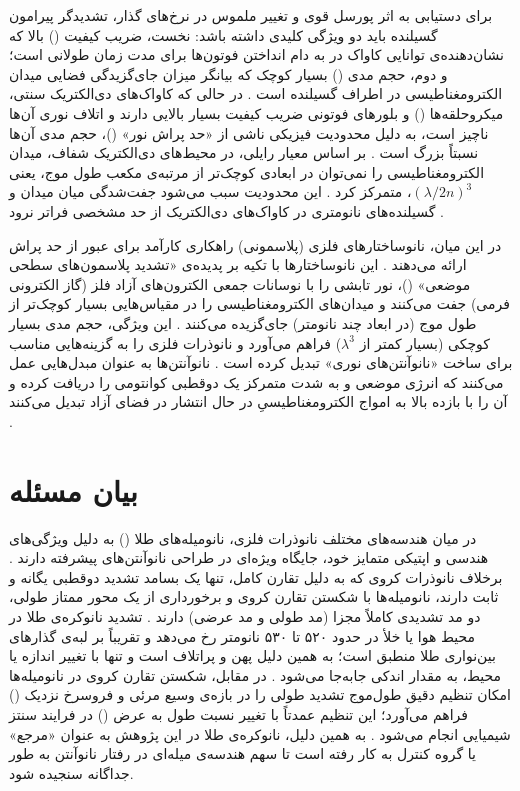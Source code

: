 \documentclass[12pt,a4paper]{report}
\begin{document}
برای دستیابی به اثر پورسل قوی و تغییر ملموس در نرخ‌های گذار، تشدیدگر پیرامون گسیلنده باید دو ویژگی کلیدی داشته باشد: نخست، ضریب کیفیت () بالا که نشان‌دهنده‌ی توانایی کاواک در به دام انداختن فوتون‌ها برای مدت زمان طولانی است؛ و دوم، حجم مدی () بسیار کوچک که بیانگر میزان جای‌گزیدگی فضایی میدان الکترومغناطیسی در اطراف گسیلنده است \cite{novotny,maier}. در حالی که کاواک‌های دی‌الکتریک سنتی، میکروحلقه‌ها () و بلورهای فوتونی ضریب کیفیت بسیار بالایی دارند و اتلاف نوری آن‌ها ناچیز است، به دلیل محدودیت فیزیکی ناشی از «حد پراش نور» ()، حجم مدی آن‌ها نسبتاً بزرگ است \cite{maier,novotny}. بر اساس معیار رایلی، در محیط‌های دی‌الکتریک شفاف، میدان الکترومغناطیسی را نمی‌توان در ابعادی کوچک‌تر از مرتبه‌ی مکعب طول موج، یعنی $(\lambda/2n)^3$، متمرکز کرد \cite{novotny}. این محدودیت سبب می‌شود جفت‌شدگی میان میدان و گسیلنده‌های نانومتری در کاواک‌های دی‌الکتریک از حد مشخصی فراتر نرود \cite{novotny,maier}.

در این میان، نانوساختارهای فلزی (پلاسمونی) راهکاری کارآمد برای عبور از حد پراش ارائه می‌دهند \cite{maier,novotny}. این نانوساختارها با تکیه بر پدیده‌ی «تشدید پلاسمون‌های سطحی موضعی» ()، نور تابشی را با نوسانات جمعی الکترون‌های آزاد فلز (گاز الکترونی فرمی) جفت می‌کنند و میدان‌های الکترومغناطیسی را در مقیاس‌هایی بسیار کوچک‌تر از طول موج (در ابعاد چند نانومتر) جای‌گزیده می‌کنند \cite{maier}. این ویژگی، حجم مدی بسیار کوچکی (بسیار کمتر از $\lambda^3$) فراهم می‌آورد و نانوذرات فلزی را به گزینه‌هایی مناسب برای ساخت «نانوآنتن‌های نوری» تبدیل کرده است \cite{novotny,bharadwaj}. نانوآنتن‌ها به عنوان مبدل‌هایی عمل می‌کنند که انرژی موضعی و به شدت متمرکز یک دوقطبی کوانتومی را دریافت کرده و آن را با بازده بالا به امواج الکترومغناطیسیِ در حال انتشار در فضای آزاد تبدیل می‌کنند \cite{novotny,maier}.

\section{بیان مسئله}
در میان هندسه‌های مختلف نانوذرات فلزی، نانومیله‌های طلا () به دلیل ویژگی‌های هندسی و اپتیکی متمایز خود، جایگاه ویژه‌ای در طراحی نانوآنتن‌های پیشرفته دارند \cite{maier,giannini}. برخلاف نانوذرات کروی که به دلیل تقارن کامل، تنها یک بسامد تشدید دوقطبی یگانه و ثابت دارند، نانومیله‌ها با شکستن تقارن کروی و برخورداری از یک محور ممتاز طولی، دو مد تشدیدی کاملاً مجزا (مد طولی و مد عرضی) دارند \cite{maier,novotny}. تشدید نانوکره‌ی طلا در محیط هوا یا خلأ در حدود ۵۲۰ تا ۵۳۰ نانومتر رخ می‌دهد و تقریباً بر لبه‌ی گذارهای بین‌نواری طلا منطبق است؛ به همین دلیل پهن و پراتلاف است و تنها با تغییر اندازه یا محیط، به مقدار اندکی جابه‌جا می‌شود \cite{bohren,kreibig,link}. در مقابل، شکستن تقارن کروی در نانومیله‌ها امکان تنظیم دقیق طول‌موج تشدید طولی را در بازه‌ی وسیع مرئی و فروسرخ نزدیک () فراهم می‌آورد؛ این تنظیم عمدتاً با تغییر نسبت طول به عرض () در فرایند سنتز شیمیایی انجام می‌شود \cite{maier,link}. به همین دلیل، نانوکره‌ی طلا در این پژوهش به عنوان «مرجع» یا گروه کنترل به کار رفته است تا سهم هندسه‌ی میله‌ای در رفتار نانوآنتن به طور جداگانه سنجیده شود.
\end{document}

